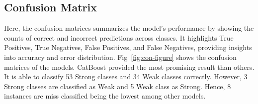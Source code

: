 \documentclass[pt]{article}  %
\begin{document}
\subsection{Confusion Matrix}
Here, the confusion matrices summarizes the model's performance by showing the counts of correct and incorrect predictions across classes. It highlights True Positives, True Negatives, False Positives, and False Negatives, providing insights into accuracy and error distribution\cite{ref11}. Fig~\ref{fig:con-figure} shows the confusion matrices of the models. CatBoost  provided the most promising result than others. It is able to classify 53 Strong classes and 34 Weak classes correctly. However, 3 Strong classes are classified as Weak and 5 Weak class as Strong. Hence, 8 instances are miss classified being the lowest among other models.
\end{document}
